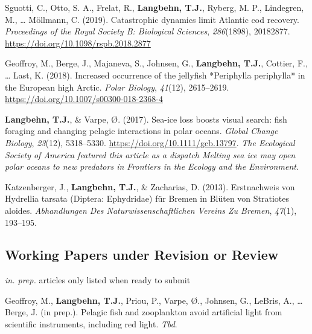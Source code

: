\documentclass[11pt, a4paper]{awesome-cv}
\begin{document}
\leavevmode\hypertarget{ref-Sguotti}{}%
Sguotti, C., Otto, S. A., Frelat, R., \textbf{Langbehn, T.J.}, Ryberg,
M. P., Lindegren, M., \ldots{} Möllmann, C. (2019). Catastrophic
dynamics limit Atlantic cod recovery. \emph{Proceedings of the Royal
Society B: Biological Sciences}, \emph{286}(1898), 20182877.
\url{https://doi.org/10.1098/rspb.2018.2877}

\leavevmode\hypertarget{ref-Geoffroy2018}{}%
Geoffroy, M., Berge, J., Majaneva, S., Johnsen, G.,
\textbf{Langbehn, T.J.}, Cottier, F., \ldots{} Last, K. (2018).
Increased occurrence of the jellyfish *Periphylla periphylla* in the
European high Arctic. \emph{Polar Biology}, \emph{41}(12), 2615--2619.
\url{https://doi.org/10.1007/s00300-018-2368-4}

\leavevmode\hypertarget{ref-Langbehn2017}{}%
\textbf{Langbehn, T.J.}, \& Varpe, Ø. (2017). Sea-ice loss boosts visual
search: fish foraging and changing pelagic interactions in polar oceans.
\emph{Global Change Biology}, \emph{23}(12), 5318--5330.
\url{https://doi.org/10.1111/gcb.13797}. \emph{The Ecological Society of
America featured this article as a dispatch Melting sea ice may open
polar oceans to new predators in Frontiers in the Ecology and the
Environment}.

\leavevmode\hypertarget{ref-Katzenberger2013}{}%
Katzenberger, J., \textbf{Langbehn, T.J.}, \& Zacharias, D. (2013).
Erstnachweis von Hydrellia tarsata (Diptera: Ephydridae) für Bremen in
Blüten von Stratiotes aloides. \emph{Abhandlungen Des
Naturwissenschaftlichen Vereins Zu Bremen}, \emph{47}(1), 193--195.

\endgroup

\hypertarget{working-papers-under-revision-or-review}{%
\subsection{Working Papers under Revision or
Review}\label{working-papers-under-revision-or-review}}

\emph{in. prep.} articles only listed when ready to submit

\begingroup
\setlength{\parindent}{-0.5in}
\setlength{\leftskip}{0.5in}

\hypertarget{refs_working_paper}{}
\leavevmode\hypertarget{ref-Geoffroy}{}%
Geoffroy, M., \textbf{Langbehn, T.J.}, Priou, P., Varpe, Ø., Johnsen,
G., LeBris, A., \ldots{} Berge, J. (in prep.). Pelagic fish and
zooplankton avoid artificial light from scientific instruments,
including red light. \emph{Tbd}.
\end{document}
